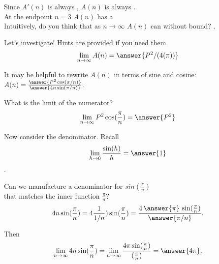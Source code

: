 \documentclass[handout,nooutcomes]{ximera}
\begin{document}
\bigskip

\begin{problem}
Since $A'(n)$ is always , $A(n)$ is always .\\
\smallskip
At the endpoint $n=3$ $A(n)$ has a \\
\smallskip
Intuitively, do you think that as $n \to \infty$ $A(n)$ can  without bound? .\\ %
\end{problem}

\medskip

\begin{problem}
Let's investigate! Hints are provided if you need them.\\
\[\lim_{n \to \infty}A(n) = \answer{P^2/(4(\pi))}\]
\begin{hint}
	It may be helpful to rewrite $A(n)$ in terms of sine and cosine:\\ $A(n) = \frac{ \answer{P^2\cos(\pi/n)} }{ \answer{4n\sin(\pi/n)} }$.
\end{hint}
\begin{hint}
    What is the limit of the numerator? \[\lim_{n \to \infty} P^2\cos(\frac{\pi}{n}) = \answer{P^2}\]
\end{hint}
\begin{hint}
  Now consider the denominator. Recall \[\lim_{h \to 0} \frac{\sin(h)}{h} = \answer{1}\].
\end{hint}
\begin{hint}
  Can we manufacture a denominator for $sin(\frac{\pi}{n})$\\ that matches the inner function $\frac{\pi}{n}?$\\
  \[4n\sin(\frac{\pi}{n}) = 4\frac{1}{1/n})\sin(\frac{\pi}{n}) = \frac{4\,\answer{\pi}\,\sin(\frac{\pi}{n})}{\answer{\pi/n}}.\]
\end{hint}
\begin{hint}
     Then \[\lim_{n \to \infty} 4n\sin(\frac{\pi}{n}) = \lim_{n \to \infty} \frac{4\pi\sin(\frac{\pi}{n})}{(\frac{\pi}{n})} = \answer{4\pi}.\]
\end{hint}
\end{problem}
\end{document}
